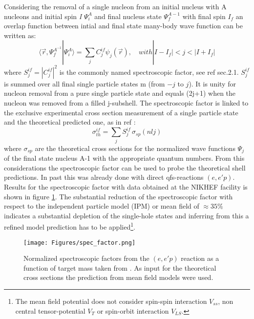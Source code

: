 Considering the removal of a single nucleon from an initial nucleus with A nucleons and initial spin \textit{I} $\Psi^A_i$ and final nucleus state  $\Psi^{A-1}_f$ with final spin $I_f$ an overlap function between intial and final state many-body wave function can be written as:
\begin{equation}
\langle \vec{r}, \Psi_f^{A^{-1}} | \Psi_i^A \rangle = \sum_j C_j^{if} \psi_j(\vec{r}), \quad with  |I - I_f| < j < |I + I_f|
\end{equation}
where $S_j^{if} = |C_j^{if}|^2$ is the commonly named spectroscopic factor, see ref \cite{hansen2003direct} sec.2.1. $S_j^{if}$ is summed over all final single particle states m (from $-j$ to $j$). It is unity for nucleon removal from a pure single particle state and equals (2j+1) when the nucleon was removed from a filled j-subshell.
The spectroscopic factor is linked to the exclusive experimental cross section measurement of a single particle state and the theoretical predicted one, as in ref \cite{hansen2003direct}:
\begin{equation}
\sigma_{th}^{if} = \sum_j S_j^{if}\,\sigma_{sp}(nlj)
\end{equation}
where $\sigma_{sp}$ are the theoretical cross sections for the normalized wave functions $\Psi_j$ of the final state nucleus A-1 with the appropriate quantum numbers.\newline
From this considerations the spectroscopic factor can be used to probe the theoretical shell predictions. In past this was already done with direct qfs-reactions $(e,e'p)$. Results for the spectroscopic factor with data obtained at the NIKHEF facility is shown in figure \ref{fig:spec_fac}. The substantial reduction of the spectroscopic factor with respect to the independent particle model (IPM) or mean field of $\approx 35\%$ indicates a substantial depletion of the single-hole states and inferring from this a refined model prediction has to be applied\footnote{The mean field potential does not consider spin-spin interaction $V_{ss}$, non central tensor-potential $V_T$ or spin-orbit interaction $V_{LS}$.}.\newline
\begin{figure}[h!]
    \centering
    \texttt{[image: Figures/spec\_factor.png]}
    \caption{Normalized spectroscopic factors from the $(e,e'p)$ reaction as a function of target mass taken from \cite{DICKHOFF2004377}. As input for the theoretical cross sections the prediction from mean field models were used. }
    \label{fig:spec_fac}
\end{figure}
